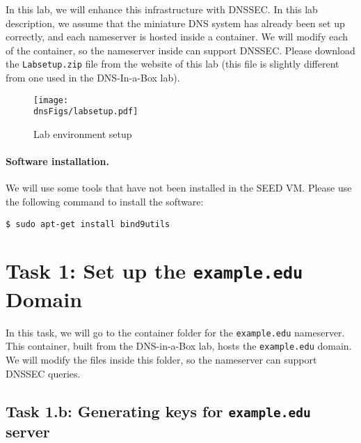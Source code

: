 In this lab, we will
enhance this infrastructure with DNSSEC. 
In this lab description, we assume that the miniature DNS system 
has already been set up
correctly, and each nameserver is hosted inside a container. 
We will modify each of the container, so the nameserver inside 
can support DNSSEC. Please download the \texttt{Labsetup.zip}
file from the website of this lab (this file is slightly different 
from one used in the DNS-In-a-Box lab).


\begin{figure}[htb]
\begin{center}
\texttt{[image: \\dnsFigs/labsetup.pdf]}
\end{center}
\caption{Lab environment setup}
\label{dnssec:fig:labsetup-simple}
\end{figure}
 


\paragraph{Software installation.} We will use some tools that 
have not been installed in the SEED VM. Please use the following
command to install the software: 

\begin{lstlisting}
$ sudo apt-get install bind9utils
\end{lstlisting}
 


\section{Task 1: Set up the \texttt{example.edu} Domain}


In this task, we will go to the container folder for the 
\texttt{example.edu} nameserver. This container, built 
from the DNS-in-a-Box lab, hosts 
the \texttt{example.edu} domain. 
We will modify the files inside this folder, so the nameserver
can support DNSSEC queries. 



\subsection{Task 1.b: Generating keys for \texttt{example.edu} server} 

